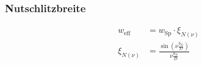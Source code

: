 \begin{sectionbox}
\subsubsection{Nutschlitzbreite}
\begin{align*}
w_\text{eff} &= w_\text{Sp}\cdot\xi_{N(\nu)}\\
\xi_{N(\nu)} &= \frac{\sin\left(\nu\frac{b_N}{D}\right)}{\nu\frac{b_N}{D}}
\end{align*}
\end{sectionbox}
